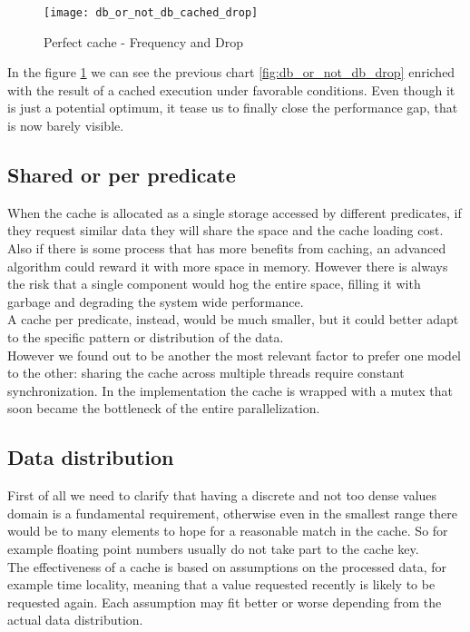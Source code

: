 \begin{figure}[h]
  \centering
  \texttt{[image: db\_or\_not\_db\_cached\_drop]}
  \caption{Perfect cache - Frequency and Drop}
  \label{fig:db_or_not_db_cached_drop}
\end{figure}

In the figure \ref{fig:db_or_not_db_cached_drop} we can see the previous chart \ref{fig:db_or_not_db_drop} enriched with the result of a cached execution under favorable conditions. Even though it is just a potential optimum, it tease us to finally close the performance gap, that is now barely visible.

\subsection{Shared or per predicate}
When the cache is allocated as a single storage accessed by different predicates, if they request similar data they will share the space and the cache loading cost. Also if there is some process that has more benefits from caching, an advanced algorithm could reward it with more space in memory. However there is always the risk that a single component would hog the entire space, filling it with garbage and degrading the system wide performance.\\
A cache per predicate, instead, would be much smaller, but it could better adapt to the specific pattern or distribution of the data.\\
However we found out to be another the most relevant factor to prefer one model to the other: sharing the cache across multiple threads require constant synchronization. In the implementation the cache is wrapped with a mutex that soon became the bottleneck of the entire parallelization.

\subsection{Data distribution}
First of all we need to clarify that having a discrete and not too dense values domain is a fundamental requirement, otherwise even in the smallest range there would be to many elements to hope for a reasonable match in the cache. So for example floating point numbers usually do not take part to the cache key.\\
The effectiveness of a cache is based on assumptions on the processed data, for example time locality, meaning that a value requested recently is likely to be requested again. Each assumption may fit better or worse depending from the actual data distribution.

